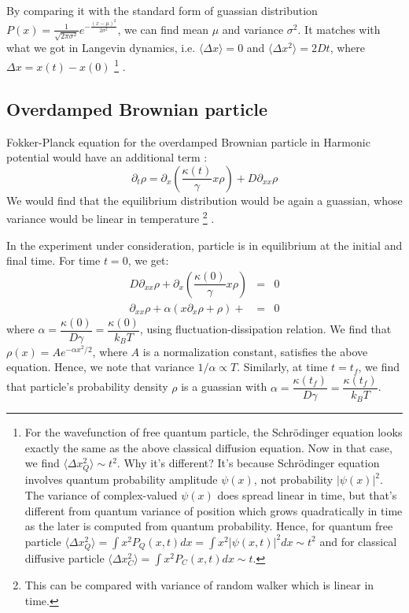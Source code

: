 \documentclass[11pt,a4paper]{article}
\begin{document}
By comparing it with the standard form of guassian distribution $P(x)= \frac{1}{\sqrt{2\pi\sigma^2} } e^{ -\frac{(x-\mu)^2}{2\sigma^2} }$,  we can find mean $\mu$ and variance $\sigma^2$. It matches with what we got in Langevin dynamics, i.e.  $\langle \Delta x\rangle=0$ and $\langle \Delta x ^2\rangle=2 Dt$, where $\Delta x= x(t)-x(0)$ \footnote{ For the wavefunction of free quantum particle, the Schr\"odinger equation looks exactly the same as the above classical diffusion equation. Now in that case, we find $\langle \Delta x_Q ^2\rangle \sim t^2$. Why it's different? It's because Schr\"odinger equation involves quantum probability amplitude $\psi(x)$, not probability $|\psi(x)|^2$. The variance of  complex-valued $\psi(x)$ does spread linear in time, but that's different from quantum variance of position which grows quadratically in time as the later is computed from quantum probability. Hence, for quantum free particle $\langle \Delta x_Q ^2\rangle = \int   x^2 P_Q(x,t) dx=  \int   x^2 |\psi(x,t)|^2 dx \sim t^2$ and for classical diffusive particle $\langle \Delta x_C ^2\rangle= \int   x^2 P_C(x,t) dx \sim t$. } .



\subsection*{Overdamped Brownian particle}
Fokker-Planck equation for the overdamped Brownian particle in Harmonic potential would have an additional term :
\begin{equation}
\partial_t \rho=  \partial_x \left( \dfrac{\kappa(t)}{\gamma} x \rho \right) + D \partial_{xx} \rho
\end{equation}
We would find that the equilibrium distribution would be again a guassian, whose variance would be linear in temperature \footnote{This can be compared with variance of random walker which is linear in time.} .

In the experiment under consideration, particle is in equilibrium at the initial and final time. For time $t=0$, we get:
\begin{eqnarray*}
 D \partial_{xx} \rho+  \partial_x \left( \dfrac{\kappa(0)}{\gamma} x \rho \right)  &=& 0 \\
  \partial_{xx} \rho + \alpha( x \partial_x   \rho +  \rho) +   &=& 0
\end{eqnarray*}
 where $\alpha = \dfrac{\kappa(0)}{D \gamma}= \dfrac{\kappa(0)}{k_B T}$, using fluctuation-dissipation relation.
We find that $\rho(x)= A e^{-\alpha x^2/2} $, where $A$ is a normalization constant, satisfies the above equation. Hence, we note that variance $1/\alpha \propto T$. Similarly, at time $t= t_f$, we find that particle's probability density $\rho$ is a guassian with $\alpha = \dfrac{\kappa(t_f)}{D \gamma}=\dfrac{\kappa(t_f)}{k_B T}$.
\end{document}
